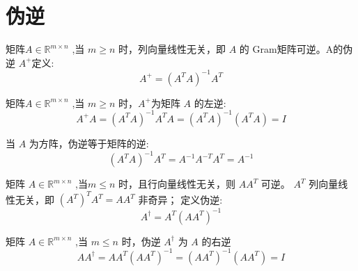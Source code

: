 \section{伪逆}

\begin{definition}
    矩阵$A \in \mathbb{R}^{m \times n} $ ,当 $ m \geq n $ 时，列向量线性无关，即 $ A $ 的 Gram矩阵可逆。A的伪逆 $ A^{+} $定义:
    \begin{equation}
    A^{+}=\left(A^{T} A\right)^{-1} A^{T}
    \end{equation}

\end{definition}


\begin{theorem}
    矩阵$A \in \mathbb{R}^{m \times n} $ ,当 $ m \geq n $ 时，$ A^{+} $为矩阵 $ A $ 的左逆:
\begin{equation}
A^{+} A=\left(A^{T} A\right)^{-1} A^{T} A=\left(A^{T} A\right)^{-1}\left(A^{T} A\right)=I
\end{equation}

\end{theorem}

\begin{theorem}
    当 $ A $ 为方阵，伪逆等于矩阵的逆:
\begin{equation}
\left(A^{T} A\right)^{-1} A^{T}=A^{-1} A^{-T} A^{T}=A^{-1}
\end{equation}
\end{theorem}



\begin{definition}
    矩阵 $  {A} \in \mathbb{R}^{m \times n} $ ,当$m \leq  {n} $ 时，且行向量线性无关，则 $ A A^{T} $ 可逆。 $ A^{T} $ 列向量线性无关，即 $ \left(A^{T}\right)^{T} A^{T}= {A} A^{T} $ 非奇异；
定义伪逆:
\begin{equation}
A^{\dagger}=A^{T}\left(A A^{T}\right)^{-1}
\end{equation}
\end{definition}

\begin{theorem}
    矩阵 $  {A} \in \mathbb{R}^{m \times n} $ ,当 $m \leq  {n} $ 时，伪逆 $ A^{\dagger} $ 为 $ A $ 的右逆
\begin{equation}
A A^{\dagger}=A A^{T}\left(A A^{T}\right)^{-1}=\left(A A^{T}\right)^{-1}\left(A A^{T}\right)=I
\end{equation}
\end{theorem}

